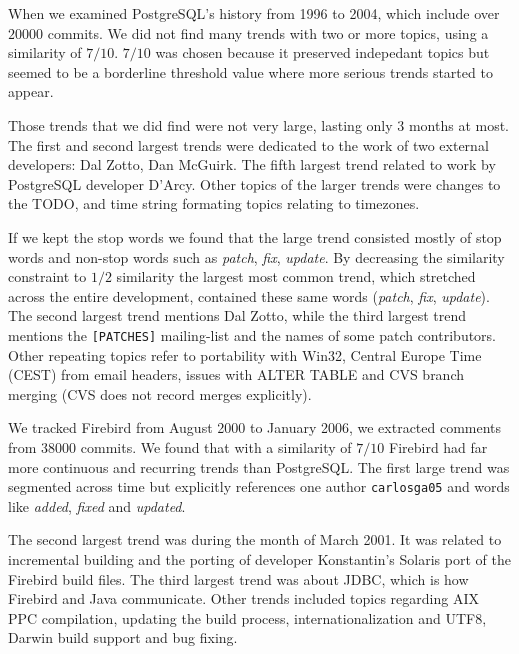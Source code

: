 \documentclass[times, 10pt,twocolumn]{article}
\newcommand{\hla}[1]{{\color{changecolor2} #1 }}
\newcommand{\shrinkit}{\vspace*{-.3em}}
\begin{document}
\shrinkit
{}
\shrinkit


When we examined PostgreSQL's history from 1996 to 2004, which include
over $20 000$ commits. We did not find many trends with two or more
topics, using a similarity of $7/10$. $7/10$ was chosen because it
preserved indepedant topics but seemed to be a borderline threshold
value where more serious trends started to appear.

Those trends that we did find
were not very large, lasting only 3 months at most. The first and second
largest trends were dedicated to the work of two external developers:
Dal Zotto, Dan McGuirk. The fifth largest trend related to work by
PostgreSQL developer D'Arcy. Other topics of the larger trends were
changes to the TODO, and time string formating topics
relating to timezones.

If we kept the stop words we found that the large trend consisted
mostly of stop words and non-stop words such as \emph{patch},
\emph{fix}, \emph{update}.  By decreasing the similarity constraint to
$1/2$ similarity the largest most common trend, which stretched across
the entire development, contained these same words (\emph{patch},
\emph{fix}, \emph{update}). The second largest trend mentions Dal
Zotto, while the third largest trend mentions the \texttt{[PATCHES]}
mailing-list and the names of some patch contributors.  Other repeating
topics refer to portability with Win32, Central Europe Time (CEST)
from email headers, issues with ALTER TABLE and CVS branch merging
(CVS does not record merges explicitly).


\shrinkit
{}
\shrinkit


\hla{
We tracked Firebird from August 2000 to January 2006, we extracted comments from $38 000$ commits. We found that with a
}
similarity of $7/10$ Firebird had far more continuous and
recurring trends than PostgreSQL.  The first large trend was segmented
across time but explicitly references one author \texttt{carlosga05}
and words like \emph{added}, \emph{fixed} and \emph{updated}.

The second largest trend was during the month of March 2001. It was
related to incremental building and the porting of developer
Konstantin's Solaris port of the Firebird build files. The third
largest trend was about JDBC, which is how Firebird and Java
communicate.  Other trends included topics regarding AIX PPC
compilation, updating the build process, internationalization and
UTF8, Darwin build support and bug fixing.
\end{document}
